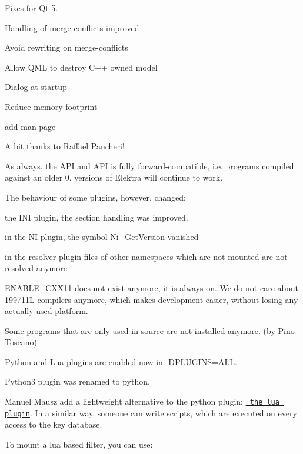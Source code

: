 \begin{DoxyItemize}
\item Fixes for Qt 5.
\item Handling of merge-\/conflicts improved
\item Avoid rewriting on merge-\/conflicts
\item Allow Q\+ML to destroy C++ owned model
\item Dialog at startup
\item Reduce memory footprint
\item add man page
\end{DoxyItemize}

A bit thanks to Raffael Pancheri!

As always, the A\+PI and A\+PI is fully forward-\/compatible, i.\+e. programs compiled against an older 0. versions of Elektra will continue to work.

The behaviour of some plugins, however, changed\+:


\begin{DoxyItemize}
\item the I\+NI plugin, the section handling was improved.
\item in the NI plugin, the symbol Ni\+\_\+\+Get\+Version vanished
\item in the resolver plugin files of other namespaces which are not mounted are not resolved anymore
\end{DoxyItemize}

E\+N\+A\+B\+L\+E\+\_\+\+C\+X\+X11 does not exist anymore, it is always on. We do not care about 199711L compilers anymore, which makes development easier, without losing any actually used platform.

Some programs that are only used in-\/source are not installed anymore. (by Pino Toscano)

Python and Lua plugins are enabled now in {\ttfamily -\/D\+P\+L\+U\+G\+I\+NS=A\+LL}.

Python3 plugin was renamed to python.

Manuel Mausz add a lightweight alternative to the python plugin\+: \href{https://master.libelektra.org/src/plugins/lua/}{\texttt{ the lua plugin}}. In a similar way, someone can write scripts, which are executed on every access to the key database.

To mount a lua based filter, you can use\+:


\begin{DoxyCode}{0}
\end{DoxyCode}


